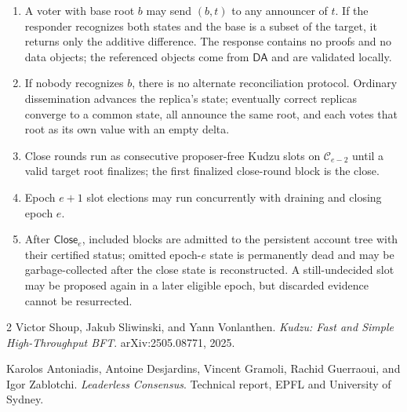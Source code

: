 \documentclass[11pt]{article}
\theoremstyle{remark}
\newcommand{\C}{\mathcal{C}}
\newcommand{\CE}{\mathsf{Close}}
\newcommand{\DA}{\mathsf{DA}}
\begin{document}
\begin{enumerate}[leftmargin=2.0em]
  \item A voter with base root $b$ may send $(b,t)$ to any announcer of $t$. If the responder recognizes both states and the base is a subset of the target, it returns only the additive difference. The response contains no proofs and no data objects; the referenced objects come from $\DA$ and are validated locally.

  \item If nobody recognizes $b$, there is no alternate reconciliation protocol. Ordinary dissemination advances the replica's state; eventually correct replicas converge to a common state, all announce the same root, and each votes that root as its own value with an empty delta.

  \item Close rounds run as consecutive proposer-free Kudzu slots on $\C_{e-2}$ until a valid target root finalizes; the first finalized close-round block is the close.

  \item Epoch $e+1$ slot elections may run concurrently with draining and closing epoch $e$.

  \item After $\CE_e$, included blocks are admitted to the persistent account tree with their certified status; omitted epoch-$e$ state is permanently dead and may be garbage-collected after the close state is reconstructed. A still-undecided slot may be proposed again in a later eligible epoch, but discarded evidence cannot be resurrected.
\end{enumerate}

\begin{thebibliography}{2}
Victor Shoup, Jakub Sliwinski, and Yann Vonlanthen.
\newblock \emph{Kudzu: Fast and Simple High-Throughput BFT}.
\newblock arXiv:2505.08771, 2025.

Karolos Antoniadis, Antoine Desjardins, Vincent Gramoli, Rachid Guerraoui, and Igor Zablotchi.
\newblock \emph{Leaderless Consensus}.
\newblock Technical report, EPFL and University of Sydney.
\end{thebibliography}
\end{document}
